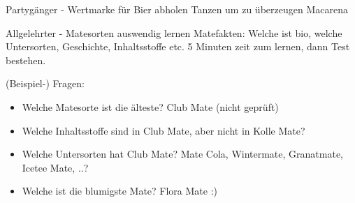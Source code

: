 Partygänger - Wertmarke für Bier abholen
Tanzen um zu überzeugen 
Macarena


Allgelehrter - Matesorten auswendig lernen
Matefakten: Welche ist bio, welche Untersorten, Geschichte, Inhaltsstoffe etc.
5 Minuten zeit zum lernen, dann Test bestehen.

(Beispiel-) Fragen:
\begin{itemize}
    \item Welche Matesorte ist die älteste? \textrightarrow Club Mate (nicht geprüft)
    \item Welche Inhaltsstoffe sind in Club Mate, aber nicht in Kolle Mate? \textrightarrow 
    \item Welche Untersorten hat Club Mate? \textrightarrow Mate Cola, Wintermate, Granatmate, Icetee Mate, ..?
    \item Welche ist die blumigste Mate? \textrightarrow Flora Mate :)
\end{itemize}
